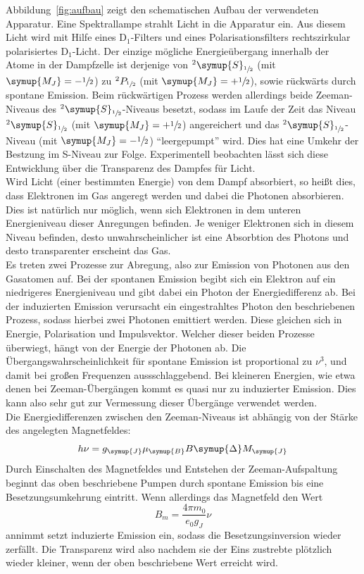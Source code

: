 Abbildung~\ref{fig:aufbau} zeigt den schematischen Aufbau der verwendeten
Apparatur. Eine Spektrallampe strahlt Licht in die Apparatur ein. Aus diesem
Licht wird mit Hilfe eines $\text{D}_1$-Filters und eines Polarisationsfilters
rechtszirkular polarisiertes $\text{D}_1$-Licht. Der einzige mögliche
Energieübergang innerhalb der Atome in der Dampfzelle ist derjenige von
$^2\symup{S}_{\sfrac{1}{2}}$ (mit $\symup{M_J}=-\sfrac{1}{2}$) zu
$^2P_{\sfrac{1}{2}}$ (mit $\symup{M_J}=+\sfrac{1}{2}$), sowie rückwärts durch
spontane Emission. Beim rückwärtigen Prozess werden allerdings beide
Zeeman-Niveaus des $^2\symup{S}_{\sfrac{1}{2}}$-Niveaus besetzt, sodass im
Laufe der Zeit das Niveau $^2\symup{S}_{\sfrac{1}{2}}$ (mit
$\symup{M_J}=+\sfrac{1}{2}$) angereichert und das
$^2\symup{S}_{\sfrac{1}{2}}$-Niveau (mit $\symup{M_J}=-\sfrac{1}{2}$)
\enquote{leergepumpt} wird. Dies hat eine Umkehr der Bestzung im S-Niveau zur
Folge. Experimentell beobachten lässt sich diese Entwicklung über die
Transparenz des Dampfes für Licht. \\
Wird Licht (einer bestimmten Energie) von dem Dampf absorbiert, so heißt dies,
dass Elektronen im Gas angeregt werden und dabei die Photonen absorbieren. Dies
ist natürlich nur möglich, wenn sich Elektronen in dem unteren Energieniveau
dieser Anregungen befinden. Je weniger Elektronen sich in diesem Niveau
befinden, desto unwahrscheinlicher ist eine Absorbtion des Photons und desto
transparenter erscheint das Gas. \\
Es treten zwei Prozesse zur Abregung, also zur Emission von Photonen aus den
Gasatomen auf. Bei der spontanen Emission begibt sich ein Elektron auf
ein niedrigeres Energieniveau und gibt dabei ein Photon der Energiedifferenz
ab. Bei der induzierten Emission verursacht ein eingestrahltes Photon
den beschriebenen Prozess, sodass hierbei zwei Photonen emittiert werden. Diese
gleichen sich in Energie, Polarisation und Impulsvektor. Welcher dieser beiden
Prozesse überwiegt, hängt von der Energie der Photonen ab. Die
Übergangswahrscheinlichkeit für spontane Emission ist proportional zu $\nu^3$,
und damit bei großen Frequenzen aussschlaggebend. Bei kleineren Energien, wie
etwa denen bei Zeeman-Übergängen kommt es quasi nur zu induzierter Emission.
Dies kann also sehr gut zur Vermessung dieser Übergänge verwendet werden. \\
Die Energiedifferenzen zwischen den Zeeman-Niveaus ist abhängig von der Stärke
des angelegten Magnetfeldes:
%
\begin{equation}
  h\nu=g_{\symup{J}}\mu_{\symup{B}}B\symup{\Delta}M_{\symup{J}}
  \label{eq:übergangsenergie}
\end{equation}
%
Durch Einschalten des Magnetfeldes und Entstehen der Zeeman-Aufspaltung beginnt
das oben beschriebene Pumpen durch spontane Emission bis eine
Besetzungsumkehrung eintritt. Wenn allerdings das Magnetfeld den Wert
%
\begin{equation}
  B_m=\frac{4\pi m_0}{e_0g_J}\nu
\end{equation}
%
annimmt setzt induzierte Emission ein, sodass die Besetzungsinversion wieder
zerfällt. Die Transparenz wird also nachdem sie der Eins zustrebte plötzlich
wieder kleiner, wenn der oben beschriebene Wert erreicht wird.

